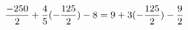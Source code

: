 \documentclass[preview]{standalone}
\begin{document}
\begin{align*}
\special{dvisvgm:raw <g id='unique000'>}\frac{-250}{2} + \frac{4}{5} (- \frac{125}{2}) - 8 = 9 + 3(- \frac{125}{2}) - \frac{9}{2}\special{dvisvgm:raw </g>}
\end{align*}
\end{document}
